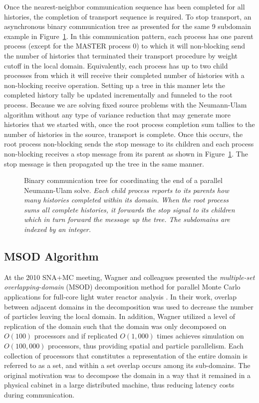 \documentclass{snamc2013}
\begin{document}
Once the nearest-neighbor communication sequence has been completed
for all histories, the completion of transport sequence is
required. To stop transport, an asynchronous binary communication tree
as presented for the same 9 subdomain example in
Figure~\ref{fig:binary_comm_tree}. In this communication pattern, each
process has one parent process (except for the MASTER process 0) to
which it will non-blocking send the number of histories that
terminated their transport procedure by weight cutoff in the local
domain. Equivalently, each process has up to two child processes from
which it will receive their completed number of histories with a
non-blocking receive operation. Setting up a tree in this manner lets
the completed history tally be updated incrementally and funneled to
the root process. Because we are solving fixed source problems with
the Neumann-Ulam algorithm without any type of variance reduction that
may generate more histories that we started with, once the root
process completion sum tallies to the number of histories in the
source, transport is complete. Once this occurs, the root process
non-blocking sends the stop message to its children and each process
non-blocking receives a stop message from its parent as shown in
Figure~\ref{fig:binary_comm_tree}. The stop message is then propagated
up the tree in the same manner.
\begin{figure}[h!]
  \begin{center}
    \scalebox{0.6}{
       }
  \end{center}
  \caption{Binary communication tree for coordinating the end of a
    parallel Neumann-Ulam solve. \textit{Each child process reports to
      its parents how many histories completed within its domain. When
      the root process sums all complete histories, it forwards the
      stop signal to its children which in turn forward the message up
      the tree. The subdomains are indexed by an integer.}}
  \label{fig:binary_comm_tree}
\end{figure}

\subsection{MSOD Algorithm}
At the 2010 SNA+MC meeting, Wagner and colleagues presented the
\textit{multiple-set overlapping-domain} (MSOD) decomposition method
for parallel Monte Carlo applications for full-core light water
reactor analysis \cite{wagner_hybrid_2010}. In their work, overlap
between adjacent domains in the decomposition was used to decrease the
number of particles leaving the local domain. In addition, Wagner
utilized a level of replication of the domain such that the domain was
only decomposed on $O(100)$ processors and if replicated $O(1,000)$
times achieves simulation on $O(100,000)$ processors, thus providing
spatial and particle parallelism. Each collection of processors that
constitutes a representation of the entire domain is referred to as a
set, and within a set overlap occurs among its sub-domains. The
original motivation was to decompose the domain in a way that it
remained in a physical cabinet in a large distributed machine, thus
reducing latency costs during communication.
\end{document}
